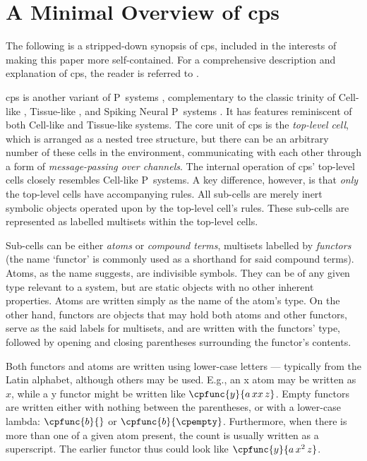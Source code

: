 \section{\label{sec:nmp:cpsreview}A Minimal Overview of \texorpdfstring{\gls{cps}}{cP~systems}}
The following is a stripped-down synopsis of \gls{cps}, included in the interests of making this paper more self-contained.  For a comprehensive description and explanation of \gls{cps}, the reader is referred to \cite{Henderson2019,Henderson2020,Nicolescu2018}.

\gls{cps} is another variant of P~systems \cite{Paun2001,Paun2002a,Paun2010b}, complementary to the classic trinity of Cell-like \cite{Paun2000}, Tissue-like \cite{Martin-Vide2003}, and Spiking Neural P~systems \cite{Ionescu2006}.  It has features reminiscent of both Cell-like and Tissue-like systems.  The core unit of \gls{cps} is the \emph{top-level cell}, which is arranged as a nested tree structure, but there can be an arbitrary number of these cells in the environment, communicating with each other through a form of \emph{message-passing over channels}.  The internal operation of \gls{cps}' top-level cells closely resembles Cell-like P~systems.  A key difference, however, is that \emph{only} the top-level cells have accompanying rules.  All sub-cells are merely inert symbolic objects operated upon by the top-level cell's rules.  These sub-cells are represented as labelled multisets within the top-level cells.

Sub-cells can be either \emph{atoms} or \emph{compound terms}, multisets labelled by \emph{functors} (the name `functor' is commonly used as a shorthand for said compound terms).  Atoms, as the name suggests, are indivisible symbols.  They can be of any given type relevant to a system, but are static objects with no other inherent properties.  Atoms are written simply as the name of the atom's type.  On the other hand, functors are objects that may hold both atoms and other functors, serve as the said labels for multisets, and are written with the functors' type, followed by opening and closing parentheses surrounding the functor's contents.

Both functors and atoms are written using lower-case letters --- typically from the Latin alphabet, although others may be used.  E.g., an x atom may be written as \(x\), while a y functor might be written like \(\cpfunc{y}{a \, xx \, z}\).  Empty functors are written either with nothing between the parentheses, or with a lower-case lambda: \(\cpfunc{b}{}\) or \(\cpfunc{b}{\cpempty}\).  Furthermore, when there is more than one of a given atom present, the count is usually written as a superscript.  The earlier functor thus could look like \(\cpfunc{y}{a \, x^2 \, z}\).

